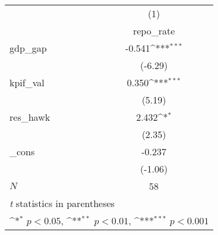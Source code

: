 {
\def\sym#1{\ifmmode^{#1}\else\(^{#1}\)\fi}
\begin{tabular}{l*{1}{c}}
\hline\hline
            &\multicolumn{1}{c}{(1)}\\
            &\multicolumn{1}{c}{repo\_rate}\\
\hline
gdp\_gap     &      -0.541\sym{***}\\
            &     (-6.29)         \\
[1em]
kpif\_val    &       0.350\sym{***}\\
            &      (5.19)         \\
[1em]
res\_hawk    &       2.432\sym{*}  \\
            &      (2.35)         \\
[1em]
\_cons      &      -0.237         \\
            &     (-1.06)         \\
\hline
\(N\)       &          58         \\
\hline\hline
\multicolumn{2}{l}{\footnotesize \textit{t} statistics in parentheses}\\
\multicolumn{2}{l}{\footnotesize \sym{*} \(p<0.05\), \sym{**} \(p<0.01\), \sym{***} \(p<0.001\)}\\
\end{tabular}
}
